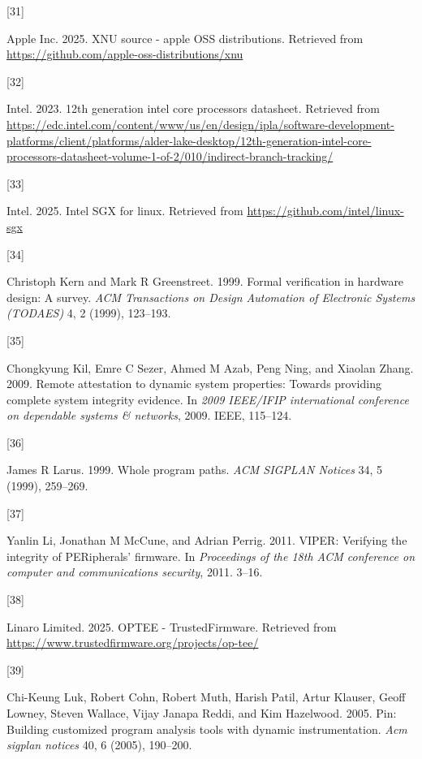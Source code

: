 \documentclass[a4paper, nobind]{templates/ociamthesis}
\newlength{\cslhangindent}
\newlength{\csllabelwidth}
\newenvironment{CSLReferences}[2] %
{\begin{list}{}{%
	\setlength{\itemindent}{0pt}
	\setlength{\leftmargin}{0pt}
	\setlength{\parsep}{0pt}
	\ifodd #1
	\setlength{\leftmargin}{\cslhangindent}
	\setlength{\itemindent}{-1\cslhangindent}
	\fi
	\setlength{\itemsep}{#2\baselineskip}}}
{\end{list}}
\newcommand{\CSLLeftMargin}[1]{\parbox[t]{\csllabelwidth}{\strut#1\strut}}
\newcommand{\CSLRightInline}[1]{\parbox[t]{\linewidth - \csllabelwidth}{\strut#1\strut}}
\begin{document}
\begin{CSLReferences}{0}{0}
\CSLLeftMargin{{[}31{]} }%
\CSLRightInline{Apple Inc. 2025. XNU source - apple OSS distributions. Retrieved from \url{https://github.com/apple-oss-distributions/xnu}}

\CSLLeftMargin{{[}32{]} }%
\CSLRightInline{Intel. 2023. 12th generation intel core processors datasheet. Retrieved from \url{https://edc.intel.com/content/www/us/en/design/ipla/software-development-platforms/client/platforms/alder-lake-desktop/12th-generation-intel-core-processors-datasheet-volume-1-of-2/010/indirect-branch-tracking/}}

\CSLLeftMargin{{[}33{]} }%
\CSLRightInline{Intel. 2025. Intel SGX for linux. Retrieved from \url{https://github.com/intel/linux-sgx}}

\CSLLeftMargin{{[}34{]} }%
\CSLRightInline{Christoph Kern and Mark R Greenstreet. 1999. Formal verification in hardware design: A survey. \emph{ACM Transactions on Design Automation of Electronic Systems (TODAES)} 4, 2 (1999), 123--193.}

\CSLLeftMargin{{[}35{]} }%
\CSLRightInline{Chongkyung Kil, Emre C Sezer, Ahmed M Azab, Peng Ning, and Xiaolan Zhang. 2009. Remote attestation to dynamic system properties: Towards providing complete system integrity evidence. In \emph{2009 IEEE/IFIP international conference on dependable systems \& networks}, 2009. IEEE, 115--124.}

\CSLLeftMargin{{[}36{]} }%
\CSLRightInline{James R Larus. 1999. Whole program paths. \emph{ACM SIGPLAN Notices} 34, 5 (1999), 259--269.}

\CSLLeftMargin{{[}37{]} }%
\CSLRightInline{Yanlin Li, Jonathan M McCune, and Adrian Perrig. 2011. VIPER: Verifying the integrity of PERipherals' firmware. In \emph{Proceedings of the 18th ACM conference on computer and communications security}, 2011. 3--16.}

\CSLLeftMargin{{[}38{]} }%
\CSLRightInline{Linaro Limited. 2025. OPTEE - TrustedFirmware. Retrieved from \url{https://www.trustedfirmware.org/projects/op-tee/}}

\CSLLeftMargin{{[}39{]} }%
\CSLRightInline{Chi-Keung Luk, Robert Cohn, Robert Muth, Harish Patil, Artur Klauser, Geoff Lowney, Steven Wallace, Vijay Janapa Reddi, and Kim Hazelwood. 2005. Pin: Building customized program analysis tools with dynamic instrumentation. \emph{Acm sigplan notices} 40, 6 (2005), 190--200.}


\end{CSLReferences}
\end{document}
